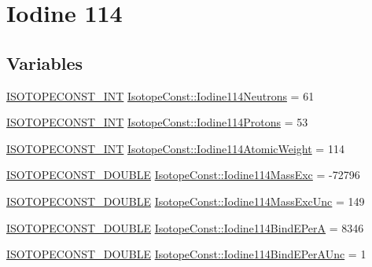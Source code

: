 \hypertarget{group___isotope_const-_iodine-_i114}{}\section{Iodine 114}
\label{group___isotope_const-_iodine-_i114}
\subsection*{Variables}
\begin{DoxyCompactItemize}
\item 
\mbox{\hyperlink{group___isotope_const-_macros_ga5f18360b3e99483a35c32d789e62621c}{I\+S\+O\+T\+O\+P\+E\+C\+O\+N\+S\+T\+\_\+\+I\+NT}} \mbox{\hyperlink{group___isotope_const-_iodine-_i114_gac032b7192ddf20cad55b1927be87d3f7}{Isotope\+Const\+::\+Iodine114\+Neutrons}} = 61
\item 
\mbox{\hyperlink{group___isotope_const-_macros_ga5f18360b3e99483a35c32d789e62621c}{I\+S\+O\+T\+O\+P\+E\+C\+O\+N\+S\+T\+\_\+\+I\+NT}} \mbox{\hyperlink{group___isotope_const-_iodine-_i114_ga39133441e5de1c39f2e098c9a0133cc4}{Isotope\+Const\+::\+Iodine114\+Protons}} = 53
\item 
\mbox{\hyperlink{group___isotope_const-_macros_ga5f18360b3e99483a35c32d789e62621c}{I\+S\+O\+T\+O\+P\+E\+C\+O\+N\+S\+T\+\_\+\+I\+NT}} \mbox{\hyperlink{group___isotope_const-_iodine-_i114_gace89af186c85ce9c80e3563e624d6801}{Isotope\+Const\+::\+Iodine114\+Atomic\+Weight}} = 114
\item 
\mbox{\hyperlink{group___isotope_const-_macros_ga8f45a7272ce02c0b4c65c44636ed719a}{I\+S\+O\+T\+O\+P\+E\+C\+O\+N\+S\+T\+\_\+\+D\+O\+U\+B\+LE}} \mbox{\hyperlink{group___isotope_const-_iodine-_i114_ga66917a240e63e69fc0582cb14f201907}{Isotope\+Const\+::\+Iodine114\+Mass\+Exc}} = -\/72796
\item 
\mbox{\hyperlink{group___isotope_const-_macros_ga8f45a7272ce02c0b4c65c44636ed719a}{I\+S\+O\+T\+O\+P\+E\+C\+O\+N\+S\+T\+\_\+\+D\+O\+U\+B\+LE}} \mbox{\hyperlink{group___isotope_const-_iodine-_i114_ga2ffc95c11fa87824a199503f12bfdd1a}{Isotope\+Const\+::\+Iodine114\+Mass\+Exc\+Unc}} = 149
\item 
\mbox{\hyperlink{group___isotope_const-_macros_ga8f45a7272ce02c0b4c65c44636ed719a}{I\+S\+O\+T\+O\+P\+E\+C\+O\+N\+S\+T\+\_\+\+D\+O\+U\+B\+LE}} \mbox{\hyperlink{group___isotope_const-_iodine-_i114_ga657da4b558a12c5c1775869c92ea8072}{Isotope\+Const\+::\+Iodine114\+Bind\+E\+PerA}} = 8346
\item 
\mbox{\hyperlink{group___isotope_const-_macros_ga8f45a7272ce02c0b4c65c44636ed719a}{I\+S\+O\+T\+O\+P\+E\+C\+O\+N\+S\+T\+\_\+\+D\+O\+U\+B\+LE}} \mbox{\hyperlink{group___isotope_const-_iodine-_i114_gacf807c38350d09b45cb058ab420e4422}{Isotope\+Const\+::\+Iodine114\+Bind\+E\+Per\+A\+Unc}} = 1

\end{DoxyCompactItemize}
